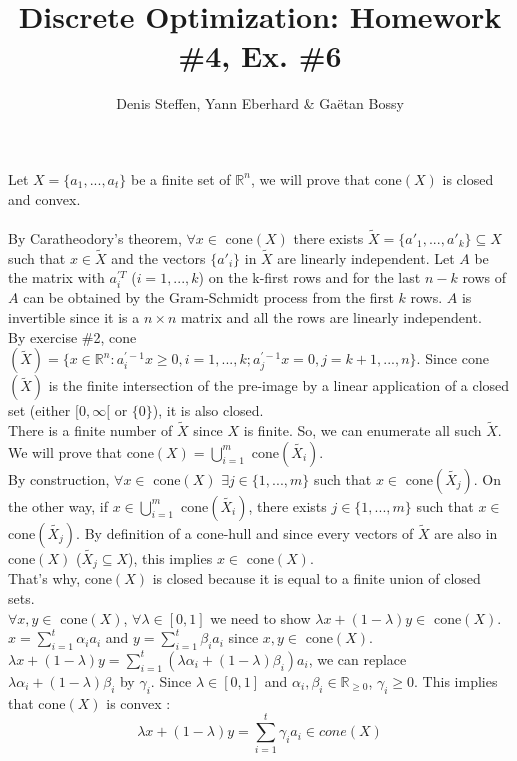 \documentclass[a4paper,11pt,french]{article}
\title{Discrete Optimization: Homework \#4, Ex. \#6}
\author{Denis Steffen, Yann Eberhard \& Gaëtan Bossy}
\begin{document}
    
    \maketitle
    Let $X=\{ a_{1}, ... , a_{t}\}$ be a finite set of $\mathbb{R}^{n}$, we will prove that cone$(X)$ is closed and convex.
    \\
    \\
    By Caratheodory's theorem, $\forall x \in$ cone$(X)$ there exists $\widetilde{X}=\{ a'_{1}, ... , a'_{k}\} \subseteq X$ such that $x \in \widetilde{X}$ and the vectors $\{ a'_{i}\}$ in $\widetilde{X}$ are linearly independent. 
    Let $A$ be the matrix with $a_{i}^{\prime T}$ ($i=1, ... , k$) on the k-first rows and for the last $n-k$ rows of $A$ can be obtained by the Gram-Schmidt process from the first $k$ rows. $A$ is invertible since it is a $n \times n$ matrix and all the rows are linearly independent.
    \\
    By exercise \#2, cone$(\widetilde{X})=\{ x\in \mathbb{R}^{n} : a_{ i}^{\prime -1}x \geq 0, i=1, ... , k ; a_{j}^{\prime -1}x = 0, j=k+1, ... , n  \}$.
    Since cone$(\widetilde{X})$ is the finite intersection of the pre-image by a linear application of a closed set (either $[0, \infty[$ or $\{0\}$), it is also closed. 
    \\
    There is a finite number of $\widetilde{X}$ since $X$ is finite. So, we can enumerate all such $\widetilde{X}$. We will prove that cone$(X)=\displaystyle{\bigcup_{ i=1}^{m}}$ cone$(\widetilde{X_{i}})$. 
    \\
    By construction, $\forall x \in$ cone$(X)$ $\exists j \in \{1, ..., m\}$ such that $x \in$ cone$(\widetilde{X_{j}})$. On the other way, if $x \in \displaystyle{\bigcup_{ i=1}^{m}}$ cone$(\widetilde{X_{i}})$, there exists $j \in \{1, ... , m \}$ such that $x \in$ cone$(\widetilde{X_{j}})$. 
    By definition of a cone-hull and since every vectors of $\widetilde{X}$ are also in cone$(X)$ ($\widetilde{X_{j}} \subseteq X$), this implies $x \in$ cone$(X)$.
    \\
    That's why, cone$(X)$ is closed because it is equal to a finite union of closed sets.
    \\
    $\forall x, y \in$ cone$(X)$, $\forall \lambda \in [0,1]$ we need to show $\lambda 
    x +(1-\lambda)y \in$ cone$(X)$. $x=\displaystyle{\sum_{i=1}^{t}} \alpha_{i} a_{i}$ and $y=\displaystyle{\sum_{i=1}^{t}} \beta_{i} a_{i}$ since $x,y \in$ cone$(X)$.
    \\
    $\lambda x +(1-\lambda)y = \displaystyle{\sum_{i=1}^{t}} (\lambda \alpha_{i} + (1-\lambda)\beta_{i}) a_{i}$, we can replace $\lambda \alpha_{i} + (1-\lambda)\beta_{i}$ by $\gamma_{i}$. Since $\lambda \in [0,1]$ and $\alpha_{i}, \beta_{i} \in \mathbb{R}_{\geq 0}$, $\gamma_{i} \geq 0$. This implies that cone$(X)$ is convex :
    \begin{equation*}
    \lambda x +(1-\lambda)y = \displaystyle{\sum_{i=1}^{t}} \gamma_{i} a_{i} \in cone(X)
    \end{equation*}
    
    
    
\end{document}
